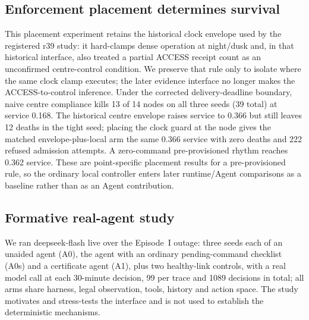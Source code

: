\documentclass[journal,10pt]{IEEEtran}
\begin{document}
\begin{table}[t]
\centering\small
\caption{Arrival-time attribution of the 2112 upgraded obligations already missed when their table
reaches the gateway (Episode~I). The online projector is exact but partial; 427 matching samples
are first heard after $t_a$ and 632 after their deadline.}
\label{tab:attribution}
\setlength{\tabcolsep}{3.5pt}\footnotesize

\end{table}

\subsection{Enforcement placement determines survival}
\label{sec:eval-place}
This placement experiment retains the historical clock envelope used by the registered r39 study:
it hard-clamps dense operation at night/dusk and, in that historical interface, also treated a
partial ACCESS receipt count as an unconfirmed centre-control condition. We preserve that rule only
to isolate where the same clock clamp executes; the later evidence interface no longer makes the
ACCESS-to-control inference. Under the corrected delivery-deadline boundary, naive centre compliance
kills 13 of 14 nodes on all three seeds (39 total) at service 0.168. The historical centre envelope
raises service to 0.366 but still leaves 12 deaths in the tight seed; placing the clock guard at the
node gives the matched envelope-plus-local arm the same 0.366 service with zero deaths and 222
refused admission attempts. A zero-command pre-provisioned rhythm reaches 0.362 service. These are
point-specific placement results for a pre-provisioned rule, so the ordinary local controller enters
later runtime/Agent comparisons as a baseline rather than as an Agent contribution.

\begin{table}[t]
\centering\small
\caption{Deterministic Episode~I placement study, no LLM. The registered centre arm uses the
historical clock envelope; the matched historical-envelope + local-guard pair keeps service at
0.366 while removing all permanent deaths in the tested seeds. Refused commands are rejected at
admission and never transmitted. Point-specific empirical results, not a survival invariant or
optimal bound.}
\label{tab:r39}

\end{table}

\subsection{Formative real-agent study}
\label{sec:eval-agent}
We ran deepseek-flash live over the Episode~I outage: three seeds each of an unaided agent (A0), the
agent with an ordinary pending-command checklist (A0s) and a certificate agent (A1), plus two
healthy-link controls, with a real model call at each 30-minute decision, 99 per trace and 1089
decisions in total; all arms share harness, legal observation, tools, history and action space.
The study motivates and stress-tests the interface and is not used to establish the deterministic
mechanisms.
\end{document}
